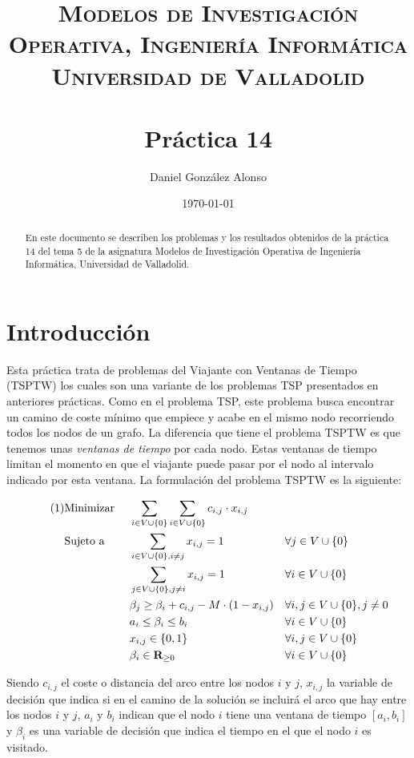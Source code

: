 \documentclass[a4paper,11pt]{article}
\title{
	\vspace{-25pt}
	\normalfont \Large \textsc{
		Modelos de Investigación Operativa,
        Ingeniería Informática\\
        Universidad de Valladolid
	}\\[10pt]
	\horrule{1pt}\\[10pt]
	\huge \textbf{
		Práctica 14
	}\\
	\horrule{1pt}
}
\author{
	\normalfont \Large Daniel González Alonso
}
\date{
	\normalfont \large \today
}
\newcommand\numberthis{							%
	\addtocounter{equation}{1}\tag{\theequation}
}
\begin{document}
\maketitle

\begin{abstract}
	En este documento se describen los problemas y los resultados obtenidos de la práctica 14 del tema 5 de la asignatura Modelos de Investigación Operativa de Ingeniería Informática, Universidad de Valladolid.
\end{abstract}

\section{Introducción}
Esta práctica trata de problemas del Viajante con Ventanas de Tiempo (TSPTW) los cuales son una variante de los problemas TSP presentados en anteriores prácticas. Como en el problema TSP, este problema busca encontrar un camino de coste mínimo que empiece y acabe en el mismo nodo recorriendo todos los nodos de un grafo. La diferencia que tiene el problema TSPTW es que tenemos unas \textit{ventanas de tiempo} por cada nodo. Estas ventanas de tiempo limitan el momento en que el viajante puede pasar por el nodo al intervalo indicado por esta ventana. La formulación del problema TSPTW es la siguiente:

\begin{align*}\numberthis
	\label{tsptw}
   	&\textrm{Minimizar }	&& \sum_{i \in V \cup \{0\}}{ \sum_{i \in V \cup \{0\}}{c_{i,j} \cdot x_{i,j}} }	&& \\
   	&\textrm{Sujeto a }		&& \sum_{i \in V \cup \{0\}, i \neq j}{x_{i,j}} = 1	&& \forall j \in V \cup \{0\}	\\
    &						&& \sum_{j \in V \cup \{0\}, j \neq i}{x_{i,j}} = 1	&& \forall i \in V \cup \{0\}	\\
    &						&& \beta_{j} \geq \beta_{i} + c_{i,j} - M \cdot (1 - x_{i,j})	&& \forall i,j \in V \cup \{0\}, j \neq 0	\\
    &						&& a_{i} \leq \beta_{i}	\leq b_{i}	&& \forall i \in V \cup \{0\}	\\
	&						&& x_{i,j} \in \{0,1\}		&& \forall i,j \in V \cup \{0\}	\\
    &						&& \beta_{i} \in \mathbf{R}_{\geq 0}	&& \forall i \in V \cup \{0\}	\\
\end{align*}

Siendo ${c_{i,j}}$ el coste o distancia del arco entre los nodos ${i}$ y ${j}$, ${x_{i,j}}$ la variable de decisión que indica si en el camino de la solución se incluirá el arco que hay entre los nodos ${i}$ y ${j}$, ${a_{i}}$ y ${b_{i}}$ indican que el nodo ${i}$ tiene una ventana de tiempo ${[a_{i}, b_{i}]}$ y ${\beta_{i}}$ es una variable de decisión que indica el tiempo en el que el nodo ${i}$ es visitado.
\end{document}
